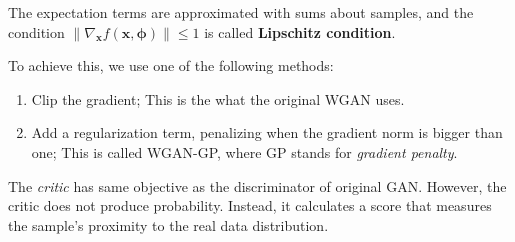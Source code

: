 \documentclass{article}
\begin{document}
            The expectation terms are approximated with sums about samples, and the condition $\|\nabla_{\textbf{x}}f(\textbf{x}, \bm{\phi})\| \leq 1$
            is called \textbf{Lipschitz condition}.

            To achieve this, we use one of the following methods:
            \begin{enumerate}
                \item Clip the gradient; This is the what the original WGAN uses.
                \item Add a regularization term, penalizing when the gradient norm is bigger than one; This is called WGAN-GP,
                    where GP stands for \emph{gradient penalty}.
            \end{enumerate}

            The \emph{critic} has same objective as the discriminator of original GAN. However, the critic
            does not produce probability. Instead, it calculates a score that measures the sample's proximity to
            the real data distribution.
\end{document}
